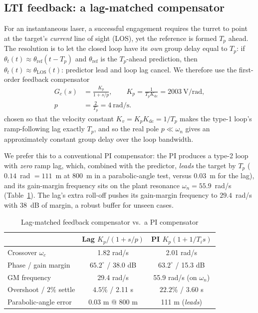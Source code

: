 \documentclass[conference]{IEEEtran}
\begin{document}
\subsection{LTI feedback: a lag-matched compensator}\label{sec:fb}
For an instantaneous laser, a successful engagement requires the turret to point at the target's \emph{current} line of sight (LOS), yet the reference is formed $T_p$ ahead. The resolution is to let the closed loop have its \emph{own} group delay equal to $T_p$: if $\theta_t(t)\approx\theta_{\mathrm{ref}}(t-T_p)$ and $\theta_{\mathrm{ref}}$ is the $T_p$-ahead prediction, then $\theta_t(t)\approx\theta_{\mathrm{LOS}}(t)$: predictor lead and loop lag cancel. We therefore use the first-order feedback compensator~\cite{franklin}
\begin{equation}
\begin{aligned}
G_c(s)&=\frac{K_p}{1+s/p},\qquad K_p=\frac{1}{T_pK_{\mathrm{dc}}}=2003\ \mathrm{V/rad},\\
p&=\frac{2}{T_p}=4\ \mathrm{rad/s}.
\end{aligned}
\label{eq:gc}
\end{equation}
chosen so that the velocity constant $K_v=K_pK_{\mathrm{dc}}=1/T_p$ makes the type-1 loop's ramp-following lag exactly $T_p$, and so the real pole $p\ll\omega_n$ gives an approximately constant group delay over the loop bandwidth.

We prefer this to a conventional PI compensator: the PI produces a type-2 loop with \emph{zero} ramp lag, which, combined with the predictor, \emph{leads} the target by $T_p$ ($0.14$~rad $=111$~m at $800$~m in a parabolic-angle test, versus $0.03$~m for the lag), and its gain-margin frequency sits on the plant resonance $\omega_n=55.9$~rad/s (Table~\ref{tab:gc}). The lag's extra roll-off pushes its gain-margin frequency to $29.4$~rad/s with $38$~dB of margin, a robust buffer for unseen cases.

\begin{table}[t]
\centering\footnotesize
\caption{Lag-matched feedback compensator vs.\ a PI compensator}
\label{tab:gc}
\begin{tabular}{@{}lcc@{}}
\toprule
 & \textbf{Lag }$K_p/(1+s/p)$ & PI $K_p(1+1/T_is)$ \\
\midrule
Crossover $\omega_c$ & 1.82 rad/s & 2.01 rad/s \\
Phase / gain margin & $65.2^\circ$ / 38.0 dB & $63.2^\circ$ / 15.3 dB \\
GM frequency & 29.4 rad/s & 55.9 rad/s (on $\omega_n$) \\
Overshoot / $2\%$ settle & $4.5\%$ / 2.11 s & $22.2\%$ / 3.60 s \\
Parabolic-angle error & 0.03 m @ 800 m & 111 m (\emph{leads}) \\
\bottomrule
\end{tabular}
\end{table}
\end{document}
